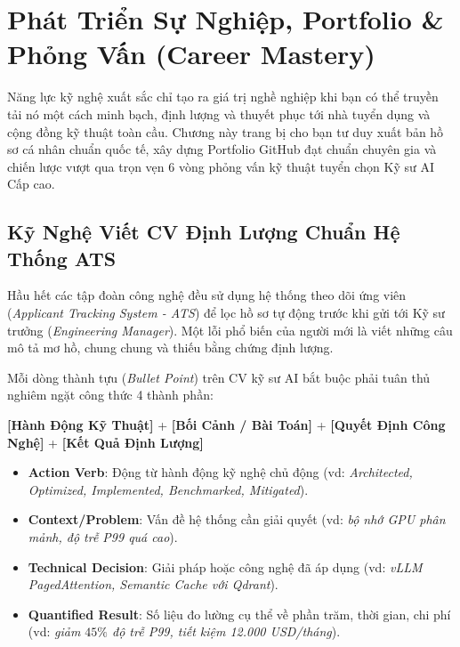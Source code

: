 
\chapter{Phát Triển Sự Nghiệp, Portfolio \& Phỏng Vấn (Career Mastery)}
\label{ch:phase9-career}

Năng lực kỹ nghệ xuất sắc chỉ tạo ra giá trị nghề nghiệp khi bạn có thể truyền tải nó một cách minh bạch, định lượng và thuyết phục tới nhà tuyển dụng và cộng đồng kỹ thuật toàn cầu. Chương này trang bị cho bạn tư duy xuất bản hồ sơ cá nhân chuẩn quốc tế, xây dựng Portfolio GitHub đạt chuẩn chuyên gia và chiến lược vượt qua trọn vẹn 6 vòng phỏng vấn kỹ thuật tuyển chọn Kỹ sư AI Cấp cao.

\section{Kỹ Nghệ Viết CV Định Lượng Chuẩn Hệ Thống ATS}
\label{sec:career-resume}

Hầu hết các tập đoàn công nghệ đều sử dụng hệ thống theo dõi ứng viên (\textit{Applicant Tracking System - ATS}) để lọc hồ sơ tự động trước khi gửi tới Kỹ sư trưởng (\textit{Engineering Manager}). Một lỗi phổ biến của người mới là viết những câu mô tả mơ hồ, chung chung và thiếu bằng chứng định lượng.

\begin{definitionbox}
Mỗi dòng thành tựu (\textit{Bullet Point}) trên CV kỹ sư AI bắt buộc phải tuân thủ nghiêm ngặt công thức 4 thành phần:
\begin{center}
\textbf{[Hành Động Kỹ Thuật]} + \textbf{[Bối Cảnh / Bài Toán]} + \textbf{[Quyết Định Công Nghệ]} + \textbf{[Kết Quả Định Lượng]}
\end{center}
\begin{itemize}
  \item \textbf{Action Verb}: Động từ hành động kỹ nghệ chủ động (vd: \textit{Architected, Optimized, Implemented, Benchmarked, Mitigated}).
  \item \textbf{Context/Problem}: Vấn đề hệ thống cần giải quyết (vd: \textit{bộ nhớ GPU phân mảnh, độ trễ P99 quá cao}).
  \item \textbf{Technical Decision}: Giải pháp hoặc công nghệ đã áp dụng (vd: \textit{vLLM PagedAttention, Semantic Cache với Qdrant}).
  \item \textbf{Quantified Result}: Số liệu đo lường cụ thể về phần trăm, thời gian, chi phí (vd: \textit{giảm $45\%$ độ trễ P99, tiết kiệm 12.000 USD/tháng}).
\end{itemize}
\end{definitionbox}

